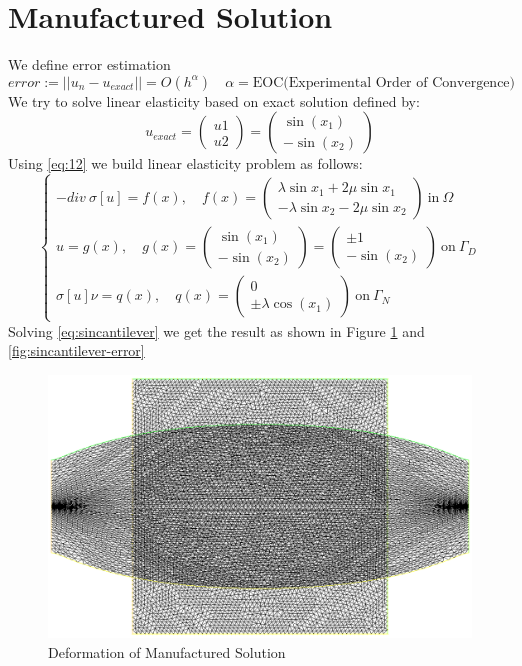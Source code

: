 \documentclass[a4paper,11pt]{article}
\begin{document}
\section{Manufactured Solution}
We define error estimation
\begin{equation}
error:=||u_n-u_{exact}|| = O(h^\alpha)\quad \alpha=\text{EOC(Experimental Order of Convergence)}
\end{equation}
We try to solve linear elasticity based on exact solution defined by:
\begin{equation}\label{eq:12}
u_{exact} = \begin{pmatrix}
u1\\
u2
\end{pmatrix} = \begin{pmatrix}
\sin(x_1)\\
-\sin(x_2)
\end{pmatrix}
\end{equation}
Using \eqref{eq:12} we build linear elasticity problem as follows:
\begin{equation}\label{eq:sincantilever}
\begin{cases}
-div\ \sigma[u]=f(x),\quad f(x)=\begin{pmatrix}
\lambda \sin x_1 + 2\mu \sin x_1\\
-\lambda \sin x_2 - 2\mu \sin x_2
\end{pmatrix}\ \text{in}\ \Omega\\

u=g(x),\quad g(x) = \begin{pmatrix}
\sin(x_1)\\
-\sin(x_2)
\end{pmatrix} = \begin{pmatrix}
\pm 1\\
-\sin(x_2)
\end{pmatrix}\ \text{on}\ \Gamma_D\\

\sigma[u] \nu = q(x), \quad q(x) = \begin{pmatrix}
0\\
\pm \lambda \cos(x_1)
\end{pmatrix}\ \text{on}\ \Gamma_N
\end{cases}
\end{equation}
Solving \eqref{eq:sincantilever} we get the result as shown in Figure \ref{fig:sincantilever-mesh} and \ref{fig:sincantilever-error}
\begin{figure}[h!]
	\centering
	\includegraphics[width=0.6\linewidth]{picture/conference/sincantilever-mesh}
	\caption{Deformation of Manufactured Solution}
	\label{fig:sincantilever-mesh}
\end{figure}
\end{document}
